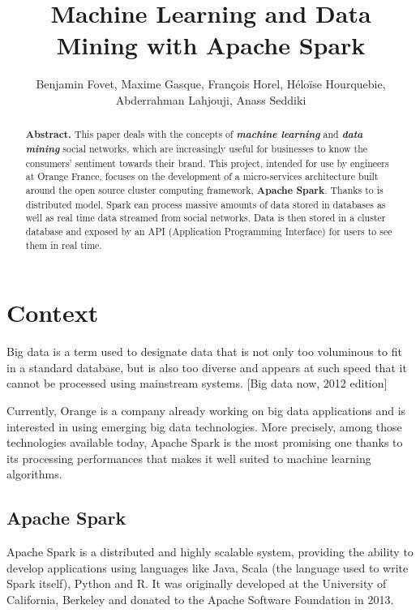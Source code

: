 \documentclass[11pt]{article}
\title{\textbf{Machine Learning and Data Mining with Apache Spark}}
\author{Benjamin Fovet, Maxime Gasque, François Horel, Héloïse Hourquebie, Abderrahman Lahjouji, Anass Seddiki}
\affil{\texttt{\{bfovet, mgasque, fhorel, hhourquebie, alahjouji, aseddiki\} @enseirb-matmeca.fr}}
\date{}
\begin{document}
\maketitle

\begin{abstract}
\textbf{Abstract.} This paper deals with the concepts of \textbf{\textit{machine learning}} and \textbf{\textit{data mining}} social networks, which are increasingly useful for businesses to know the consumers' sentiment towards their brand. This project, intended for use by engineers at \textsf{Orange France}, focuses on the development of a micro-services architecture built around the open source cluster computing framework, \textsf{\textbf{Apache Spark}}. Thanks to is distributed model, \textsf{Spark} can process massive amounts of data stored in databases as well as real time data streamed from social networks. Data is then stored in a cluster database and exposed by an API (Application Programming Interface) for users to see them in real time.
\end{abstract}

\section{Context}
Big data is a term used to designate data that is not only too voluminous to fit in a standard database, but is also too diverse and appears at such speed that it cannot be processed using mainstream systems. [Big data now, 2012 edition]
\vskip 9pt

Currently, \textsf{Orange} is a company already working on big data applications and is interested in using emerging big data technologies. More precisely, among those technologies available today, \textsf{Apache Spark} is the most promising one thanks to its processing performances that makes it well suited to machine learning algorithms.

\subsection{Apache Spark}
\label{apache spark}
\textsf{Apache Spark} is a distributed and highly scalable system, providing the ability to develop applications using languages like \textsf{Java}, \textsf{Scala} (the language used to write \textsf{Spark} itself), \textsf{Python} and \textsf{R}. It was originally developed at the University of California, Berkeley and donated to the Apache Software Foundation in 2013.
\end{document}
